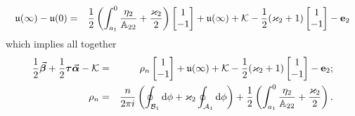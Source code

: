 \documentclass[10pt,oneside,reqno]{amsart}
\numberwithin{equation}{section}
\renewcommand{\d}{{\mathrm d}}
\begin{document}
\begin{eqnarray*}
  \mathfrak{u}(\infty)-\mathfrak{u}(0)
&=&\frac{1}{2}\left(\int_{a_1}^0\frac{\eta_2}{\mathbb{A}_{22}}+\frac{\varkappa_2}{2}\right)\begin{bmatrix}
                                                                                            1\\
-1\\
                                                                                           \end{bmatrix}+\mathfrak{u}(\infty)+\mathcal{K}-\frac{1}{2}(\varkappa_2+1)\begin{bmatrix}
1\\
-1\\
\end{bmatrix}-{\bf e}_2
\end{eqnarray*}
which implies all together
\begin{eqnarray}
 \frac{1}{2}\vec{\boldsymbol \beta}+\frac{1}{2}{\boldsymbol \tau}\vec{\boldsymbol \alpha} -\mathcal{K}&=&\rho_n\begin{bmatrix}
                                                                   1\\
-1\\
                                                                  \end{bmatrix}+\mathfrak{u}(\infty)+\mathcal{K}-\frac{1}{2}(\varkappa_2+1)\begin{bmatrix}
1\\
-1\\
\end{bmatrix}-{\bf e}_2;\label{simple}\\
\rho_n&=&\frac{n}{2\pi i}\left(\oint_{\mathcal{B}_1}\d\phi+\varkappa_2\oint_{\mathcal{A}_1}\d\phi\right)
  +\frac{1}{2}\left(\int_{a_1}^0\frac{\eta_2}{\mathbb{A}_{22}}+\frac{\varkappa_2}{2}\right)\nonumber.
\end{eqnarray}
\end{document}
